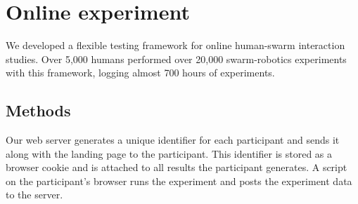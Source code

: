 \section{Online experiment}
\label{sec:expMethods}




We developed a flexible testing framework for online human-swarm interaction studies. Over 5,000 humans performed over 20,000 swarm-robotics experiments with this framework, logging almost 700 hours of experiments.

\subsection{Methods}


Our web server generates a unique identifier for each participant and sends it along with the landing page to the participant. 
This identifier is stored as a browser cookie and is attached to all results the participant generates. 
A script on the participant's browser runs the experiment and posts the experiment data to the server. 

